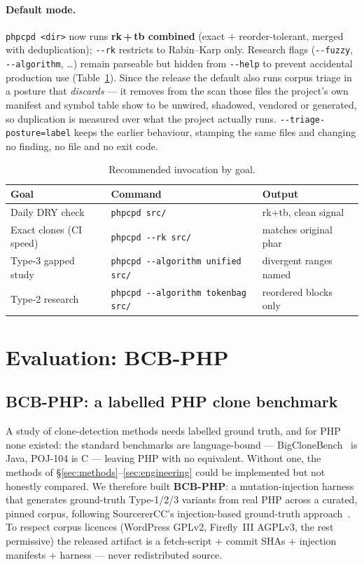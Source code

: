 \documentclass[10pt,a4paper]{article}
\newcounter{lem}[section]
\begin{document}
\paragraph{Default mode.} \texttt{phpcpd <dir>} now runs \textbf{rk\,+\,tb combined} (exact $+$
reorder-tolerant, merged with deduplication); \texttt{-{}-rk} restricts to Rabin--Karp only. Research
flags (\texttt{-{}-fuzzy}, \texttt{-{}-algorithm}, \dots) remain parseable but hidden from
\texttt{-{}-help} to prevent accidental production use (Table~\ref{tab:reco}). Since the \factCodeRelease{}
release the default also runs corpus triage in a posture that \emph{discards} --- it removes from the
scan those files the project's own manifest and symbol table show to be unwired, shadowed, vendored
or generated, so duplication is measured over what the project actually runs.
\texttt{-{}-triage-posture=label} keeps the earlier behaviour, stamping the same files and changing
no finding, no file and no exit code.

\begin{table}[h]
\centering
\caption{Recommended invocation by goal.}
\label{tab:reco}
\small
\begin{tabular}{l l l}
\toprule
\textbf{Goal} & \textbf{Command} & \textbf{Output} \\
\midrule
Daily DRY check       & \texttt{phpcpd src/}                       & rk+tb, clean signal \\
Exact clones (CI speed)& \texttt{phpcpd -{}-rk src/}               & matches original phar \\
Type-3 gapped study   & \texttt{phpcpd -{}-algorithm unified src/}   & divergent ranges named \\
Type-2 research       & \texttt{phpcpd -{}-algorithm tokenbag src/}            & reordered blocks only \\
\bottomrule
\end{tabular}
\end{table}

\section{Evaluation: BCB-PHP}
\label{sec:eval}

\subsection{BCB-PHP: a labelled PHP clone benchmark}
A study of clone-detection methods needs labelled ground truth, and for PHP none existed: the standard
benchmarks are language-bound --- BigCloneBench~\cite{bigclonebench} is Java, POJ-104 is C --- leaving
PHP with no equivalent. Without one, the methods of \S\ref{sec:methods}--\ref{sec:engineering} could
be implemented but not honestly compared. We therefore built \textbf{BCB-PHP}: a mutation-injection
harness that generates ground-truth Type-1/2/3 variants from real PHP across a curated, pinned corpus,
following SourcererCC's injection-based ground-truth approach~\cite{sourcerercc}. To respect corpus
licences (WordPress GPLv2, Firefly~III AGPLv3, the rest permissive) the released artifact is a
fetch-script $+$ commit SHAs $+$ injection manifests $+$ harness --- never redistributed source.
\end{document}
